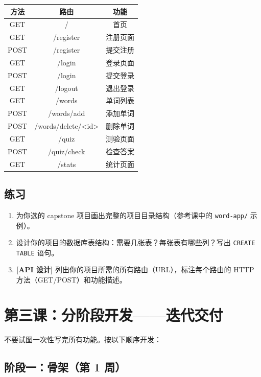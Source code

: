 \documentclass[a4paper,12pt]{ctexart}
\begin{document}
\begin{center}
\begin{tabular}{|c|c|c|}
\hline
\textbf{方法} & \textbf{路由} & \textbf{功能} \\ \hline
GET & / & 首页 \\ \hline
GET & /register & 注册页面 \\ \hline
POST & /register & 提交注册 \\ \hline
GET & /login & 登录页面 \\ \hline
POST & /login & 提交登录 \\ \hline
GET & /logout & 退出登录 \\ \hline
GET & /words & 单词列表 \\ \hline
POST & /words/add & 添加单词 \\ \hline
POST & /words/delete/<id> & 删除单词 \\ \hline
GET & /quiz & 测验页面 \\ \hline
POST & /quiz/check & 检查答案 \\ \hline
GET & /stats & 统计页面 \\ \hline
\end{tabular}
\end{center}

\subsection*{练习}

\begin{enumerate}
  \item 为你选的 capstone 项目画出完整的项目目录结构（参考课中的 \texttt{word-app/} 示例）。
  \item 设计你的项目的数据库表结构：需要几张表？每张表有哪些列？写出 \texttt{CREATE TABLE} 语句。
  \item \textbf{[API 设计]} 列出你的项目所需的所有路由（URL），标注每个路由的 HTTP 方法（GET/POST）和功能描述。
\end{enumerate}

\section*{第三课：分阶段开发——迭代交付}

不要试图一次性写完所有功能。按以下顺序开发：

\subsection*{阶段一：骨架（第 1 周）}
\end{document}
